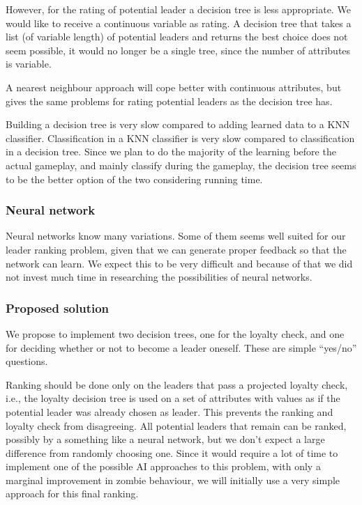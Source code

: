 However, for the rating of potential leader a decision tree is less appropriate. We would like to receive a continuous variable as rating. A decision tree that takes a list (of variable length) of potential leaders and returns the best choice does not seem possible, it would no longer be a single tree, since the number of attributes is variable.

A nearest neighbour approach will cope better with continuous attributes, but gives the same problems for rating potential leaders as the decision tree has.

Building a decision tree is very slow compared to adding learned data to a KNN classifier. Classification in a KNN classifier is very slow compared to classification in a decision tree. Since we plan to do the majority of the learning before the actual gameplay, and mainly classify during the gameplay, the decision tree seems to be the better option of the two considering running time.

\subsubsection{Neural network}
Neural networks know many variations. Some of them seems well suited for our leader ranking problem, given that we can generate proper feedback so that the network can learn. We expect this to be very difficult and because of that we did not invest much time in researching the possibilities of neural networks.

\subsubsection{Proposed solution}
We propose to implement two decision trees, one for the loyalty check, and one for deciding whether or not to become a leader oneself. These are simple ``yes/no'' questions.

Ranking should be done only on the leaders that pass a projected loyalty check, i.e., the loyalty decision tree is used on a set of attributes with values as if the potential leader was already chosen as leader. This prevents the ranking and loyalty check from disagreeing. All potential leaders that remain can be ranked, possibly by a something like a neural network, but we don't expect a large difference from randomly choosing one. Since it would require a lot of time to implement one of the possible AI approaches to this problem, with only a marginal improvement in zombie behaviour, we will initially use a very simple approach for this final ranking.

